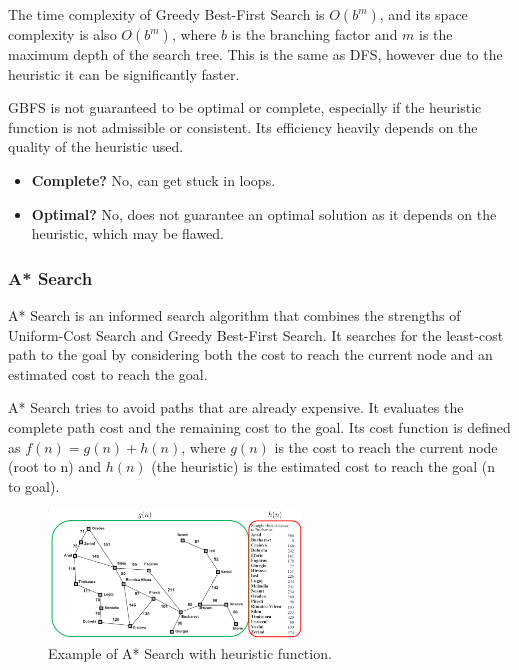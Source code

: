 \documentclass[
../../EiKI_Summary.tex,
]
{subfiles}
\begin{document}
 The time complexity of Greedy Best-First Search is $O(b^m)$, and its space complexity is also $O(b^m)$, where $b$ is the branching factor and $m$ is the maximum depth of the search tree. This is the same as DFS, however due to the heuristic it can be significantly faster.

GBFS is not guaranteed to be optimal or complete, especially if the heuristic function is not admissible or consistent. Its efficiency heavily depends on the quality of the heuristic used.

\begin{itemize}
    \item \textbf{Complete?} No, can get stuck in loops.
    \item \textbf{Optimal?} No, does not guarantee an optimal solution as it depends on the heuristic, which may be flawed.
\end{itemize}


\subsubsection{A* Search}
\begin{defbox}
    [Definition]
    A* Search is an informed search algorithm that combines the strengths of Uniform-Cost Search and Greedy Best-First Search. It searches for the least-cost path to the goal by considering both the cost to reach the current node and an estimated cost to reach the goal.
\end{defbox}

A* Search tries to avoid paths that are already expensive. It evaluates the complete path cost and the remaining cost to the goal. Its cost function is defined as $f(n) = g(n) + h(n)$, where $g(n)$ is the cost to reach the current node (root to n) and $h(n)$ (the heuristic) is the estimated cost to reach the goal (n to goal).

\begin{figure}[htp]
    \centering
    \includegraphics[width=0.6\textwidth]{Pics/3/AStarSearchExample.png}
    \caption{Example of A* Search with heuristic function.}
\end{figure}
\end{document}
